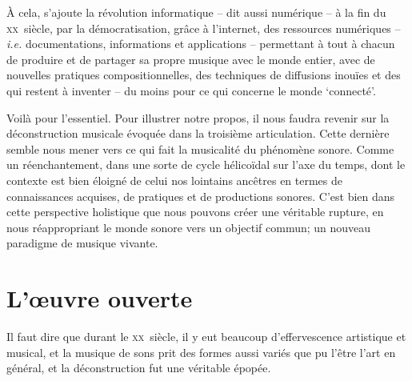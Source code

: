 \documentclass{article}
\begin{document}
À cela, s'ajoute la révolution informatique  -- dit aussi numérique --  à la fin du \textsc{xx}\ieme ~siècle,  par la démocratisation, grâce à l'internet, des ressources numériques -- \textit{i.e.} documentations, informations et applications -- permettant à tout à chacun de produire et de partager sa propre musique avec le monde entier, avec de nouvelles pratiques compositionnelles, des techniques de diffusions inouïes et des qui restent à inventer -- du moins pour ce qui concerne le monde `connecté'.


\bigskip

Voilà pour l'essentiel. Pour illustrer notre propos, il nous faudra revenir sur la déconstruction musicale évoquée dans la troisième articulation. Cette dernière semble nous mener vers ce qui fait la musicalité du phénomène sonore. Comme un réenchantement, dans une sorte de cycle hélicoïdal sur l'axe du temps, dont le contexte est bien éloigné de celui nos lointains ancêtres en termes de connaissances acquises, de pratiques et de productions sonores. C'est bien dans cette perspective holistique que nous pouvons créer une véritable rupture, en nous réappropriant le monde sonore vers un objectif commun; un nouveau paradigme de musique vivante.

\section{L'œuvre ouverte}

Il faut dire que durant le \textsc{xx}\ieme ~siècle, il y eut beaucoup d'effervescence artistique et musical, et la musique de sons prit des formes aussi variés que pu l'être l'art en général, et la déconstruction fut une véritable épopée.
\end{document}
